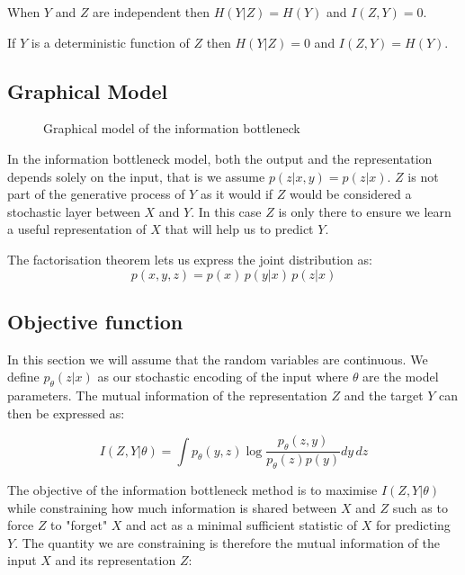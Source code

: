 \documentclass[11pt,oneside,openright]{report}
\begin{document}
When $Y$ and $Z$ are independent then  $H(Y|Z) = H(Y)$ and $I(Z, Y) = 0$. 

If $Y$ is a deterministic function of $Z$ then $H(Y|Z) = 0$ and $I(Z, Y) = H(Y)$. 

\subsection{Graphical Model}

\begin{figure}[H]
\centering
{}
\caption{Graphical model of the information bottleneck}
\end{figure}

In the information bottleneck model, both the output and the representation depends solely on the input, that is we assume $p(z | x, y) = p(z|x)$. $Z$ is not part of the generative process of $Y$ as it would if $Z$ would be considered a stochastic layer between $X$ and $Y$. In this case $Z$ is only there to ensure we learn a useful representation of $X$ that will help us to predict $Y$.

The factorisation theorem lets us express the joint distribution as:
$$ p(x, y, z) = p(x)\, p(y|x)\, p(z|x)$$

\subsection{Objective function}
In this section we will assume that the random variables are continuous. We define $p_\theta(z|x)$ as our stochastic encoding of the input where $\theta$ are the model parameters. The mutual information of the representation $Z$ and the target $Y$ can then be expressed as:

$$ I(Z, Y|\theta) = \int p_\theta(y, z) \log \frac{p_\theta(z, y)}{p_\theta(z)p(y)} dy\,dz $$

The objective of the information bottleneck method is to maximise $I(Z, Y|\theta)$ while constraining how much information is shared between $X$ and $Z$ such as to force $Z$ to "forget" $X$ and act as a minimal sufficient statistic of $X$ for predicting $Y$. The quantity we are constraining is therefore the mutual information of the input $X$ and its representation $Z$:
\end{document}

